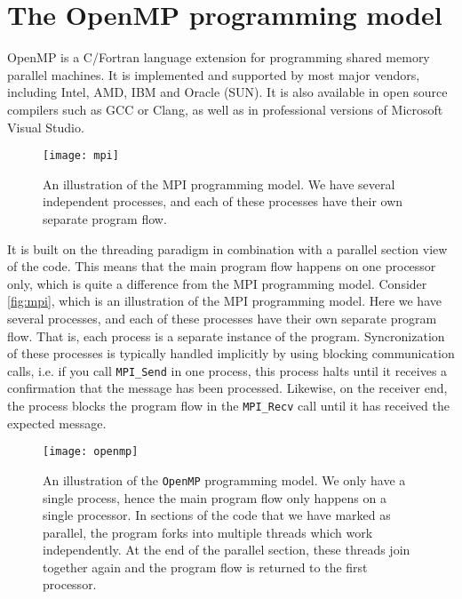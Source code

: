 \section{The OpenMP programming model}

OpenMP is a C/Fortran language extension for programming shared memory parallel
machines. It is implemented and supported by most major vendors, including
Intel, AMD, IBM and Oracle (SUN). It is also available in open source compilers
such as GCC or Clang, as well as in professional versions of Microsoft Visual
Studio.

\begin{figure}
  \begin{center}
    \texttt{[image: mpi]}
  \end{center}
  \caption{
    An illustration of the MPI programming model. We have several independent
    processes, and each of these processes have their own separate program
    flow.
  }
  \label{fig:mpi}
\end{figure}

It is built on the threading paradigm in combination with a parallel section
view of the code. This means that the main program flow happens on one processor
only, which is quite a difference from the MPI programming model. Consider
\autoref{fig:mpi}, which is an illustration of the MPI programming model. Here
we have several processes, and each of these processes have their own separate
program flow. That is, each process is a separate instance of the program.
Syncronization of these processes is typically handled implicitly by using
blocking communication calls, i.e. if you call \texttt{MPI\_Send} in one
process, this process halts until it receives a confirmation that the message
has been processed. Likewise, on the receiver end, the process blocks the
program flow in the \texttt{MPI\_Recv} call until it has received the expected
message.

\begin{figure}
  \begin{center}
    \texttt{[image: openmp]}
  \end{center}
  \caption{
    An illustration of the \texttt{OpenMP} programming model. We only have a
    single process, hence the main program flow only happens on a single
    processor. In sections of the code that we have marked as parallel, the
    program forks into multiple threads which work independently. At the end of
    the parallel section, these threads join together again and the program flow
    is returned to the first processor.
  }
  \label{fig:openmp}
\end{figure}

